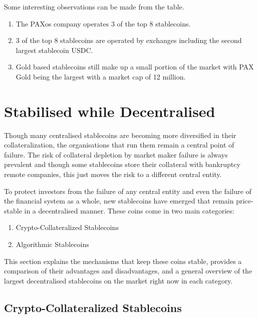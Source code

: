 \documentclass[english,]{IEEEtran}
\providecommand{\tightlist}{%
  \setlength{\itemsep}{0pt}\setlength{\parskip}{0pt}}
\begin{document}
Some interesting observations can be made from the table.

\begin{enumerate}
\def\labelenumi{\arabic{enumi}.}
\tightlist
\item
  The PAXos company operates 3 of the top 8 stablecoins.
\item
  3 of the top 8 stablecoins are operated by exchanges including the
  second largest stablecoin USDC.
\item
  Gold based stablecoins still make up a small portion of the market
  with PAX Gold being the largest with a market cap of 12 million.
\end{enumerate}

\hypertarget{stabilised-while-decentralised}{%
\section{Stabilised while
Decentralised}\label{stabilised-while-decentralised}}

Though many centralised stablecoins are becoming more diversified in
their collateralization, the organisations that run them remain a
central point of failure. The risk of collateral depletion by market
maker failure is always prevalent and though some stablecoins store
their collateral with bankruptcy remote companies, this just moves the
risk to a different central entity.

To protect investors from the failure of any central entity and even the
failure of the financial system as a whole, new stablecoins have emerged
that remain price-stable in a decentralised manner. These coins come in
two main categories:

\begin{enumerate}
\def\labelenumi{\arabic{enumi}.}
\tightlist
\item
  Crypto-Collateralized Stablecoins
\item
  Algorithmic Stablecoins
\end{enumerate}

This section explains the mechanisms that keep these coins stable,
provides a comparison of their advantages and disadvantages, and a
general overview of the largest decentralised stablecoins on the market
right now in each category.

\hypertarget{crypto-collateralized-stablecoins}{%
\subsection{Crypto-Collateralized
Stablecoins}\label{crypto-collateralized-stablecoins}}
\end{document}

